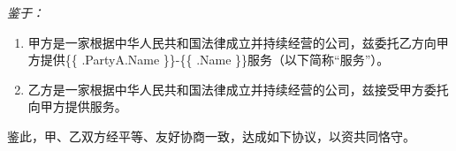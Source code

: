 \begin{titlepage}
\begin{center}
  \vspace{1.0cm}
  \vfill

  \end{center}

  \emph{鉴于：}
  \begin{enumerate}
    \item 甲方是一家根据中华人民共和国法律成立并持续经营的公司，兹委托乙方向甲方提供\{\{ .PartyA.Name \}\}-\{\{ .Name \}\}服务（以下简称“服务”）。 
    \item 乙方是一家根据中华人民共和国法律成立并持续经营的公司，兹接受甲方委托向甲方提供服务。
  \end{enumerate}

  鉴此，甲、乙双方经平等、友好协商一致，达成如下协议，以资共同恪守。
\end{titlepage}
